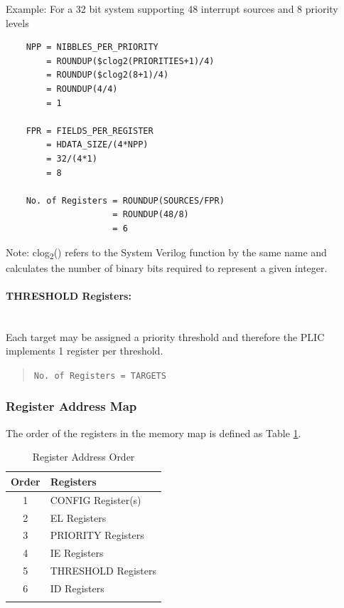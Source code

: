 Example: For a 32 bit system supporting 48 interrupt sources and 8
priority levels

\begin{verbatim}
    NPP = NIBBLES_PER_PRIORITY
        = ROUNDUP($clog2(PRIORITIES+1)/4)
        = ROUNDUP($clog2(8+1)/4)
        = ROUNDUP(4/4)
        = 1

    FPR = FIELDS_PER_REGISTER
        = HDATA_SIZE/(4*NPP)
        = 32/(4*1)
        = 8

    No. of Registers = ROUNDUP(SOURCES/FPR)
                     = ROUNDUP(48/8)
                     = 6
\end{verbatim}

Note: clog\textsubscript{2}() refers to the System Verilog function by
the same name and calculates the number of binary bits required to
represent a given integer.

\paragraph{THRESHOLD Registers:} ~\\

Each target may be assigned a priority threshold and therefore the PLIC
implements 1 register per threshold.

\begin{quote}
\texttt{No.\ of\ Registers\ =\ TARGETS}
\end{quote}

\subsubsection{Register Address Map}

The order of the registers in the memory map is defined as Table \ref{tab:REGMAP}.

\begin{longtable}[c]{@{}cp{4cm}@{}}	
		\toprule 
		\textbf{Order} & \textbf{Registers}\\
		\midrule
		\endhead 
		1 & CONFIG Register(s)\\
		2 & EL Registers\\
		3 & PRIORITY Registers\\
		4 & IE Registers\\
		5 & THRESHOLD Registers\\
		6 & ID Registers\\
		\bottomrule 	
	\caption{Register Address Order}
	\label{tab:REGMAP}
\end{longtable}

